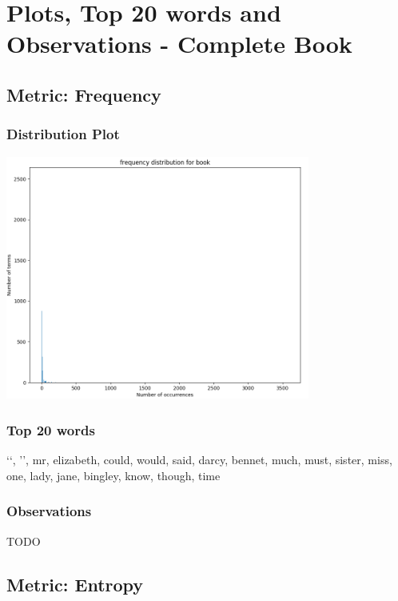 \documentclass{article}
\begin{document}
\section{Plots, Top 20 words and Observations - Complete Book}
\subsection{Metric: Frequency}
\subsubsection{Distribution Plot}
\begin{flushleft}
	\includegraphics[width=0.75\textwidth]{./images/frequency-distribution-book.png}
\end{flushleft}
\subsubsection{Top 20 words}
\begin{flushleft}
	\lq\lq, \rq\rq, mr, elizabeth, could, would, said, darcy, bennet, much, must, sister, miss, one, lady, jane, bingley, know, though, time
\end{flushleft}
\subsubsection{Observations}
TODO

\newpage
\subsection{Metric: Entropy}
\end{document}
